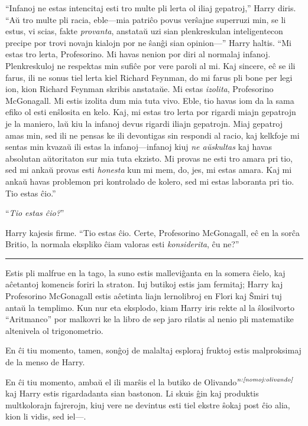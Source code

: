 ``Infanoj ne estas intencitaj esti tro multe pli lerta ol iliaj
gepatroj,'' Harry diris. ``Aŭ tro multe pli racia, eble—mia patriĉo
povus verŝajne superruzi min, se li estus, vi scias, fakte
\emph{provanta}, anstataŭ uzi sian plenkreskulan inteligentecon
precipe por trovi novajn kialojn por ne ŝanĝi sian opinion—'' Harry
haltis. ``Mi estas tro lerta, Profesorino. Mi havas nenion por diri al
normalaj infanoj. Plenkreskuloj ne respektas min sufiĉe por vere
paroli al mi. Kaj sincere, eĉ se ili farus, ili ne sonus tiel lerta
kiel Richard Feynman, do mi farus pli bone per legi ion, kion Richard
Feynman skribis anstataŭe. Mi estas \emph{izolita}, Profesorino
McGonagall. Mi estis izolita dum mia tuta vivo. Eble, tio havas iom da
la sama efiko ol esti enŝlosita en kelo. Kaj, mi estas tro lerta por
rigardi miajn gepatrojn je la maniero, laŭ kiu la infanoj devus
rigardi iliajn gepatrojn. Miaj gepatroj amas min, sed ili ne pensas ke
ili devontigas sin respondi al racio, kaj kelkfoje mi sentas min
kvazaŭ ili estas la infanoj—infanoj kiuj \emph{ne aŭskultas} kaj havas
absolutan aŭtoritaton sur mia tuta ekzisto. Mi provas ne esti tro
amara pri tio, sed mi ankaŭ provas esti \emph{honesta} kun mi mem, do,
jes, mi estas amara. Kaj mi ankaŭ havas problemon pri kontrolado de
kolero, sed mi estas laboranta pri tio. Tio estas ĉio.''

``\emph{Tio estas ĉio?}''

Harry kajesis firme. ``Tio estas ĉio. Certe, Profesorino McGonagall,
eĉ en la sorĉa Britio, la normala ekspliko ĉiam valoras esti
\emph{konsiderita}, ĉu ne?''

\begin{center}\rule{3in}{0.4pt}\end{center}

Estis pli malfrue en la tago, la suno estis malleviĝanta en la somera
ĉielo, kaj aĉetantoj komencis foriri la straton. Iuj butikoj estis
jam fermitaj; Harry kaj Profesorino McGonagall estis aĉetinta liajn
lernolibroj en Flori kaj Ŝmiri tuj antaŭ la templimo. Kun nur eta
eksplodo, kiam Harry iris rekte al la ŝlosilvorto ``Aritmanco'' por
malkovri ke la libro de sep jaro rilatis al nenio pli matematike
altenivela ol trigonometrio.

En ĉi tiu momento, tamen, sonĝoj de malaltaj esploraj fruktoj estis
malproksimaj de la menso de Harry.

En ĉi tiu momento, ambaŭ el ili marŝis el la butiko de
Olivando$^{\textit{n:\ref{nomoj:olivando}}}$ kaj Harry estis rigardadanta sian
bastonon. Li skuis ĝin kaj produktis multkolorajn fajrerojn, kiuj vere
ne devintus esti tiel ekstre ŝokaj post ĉio alia, kion li vidis, sed
iel—.

